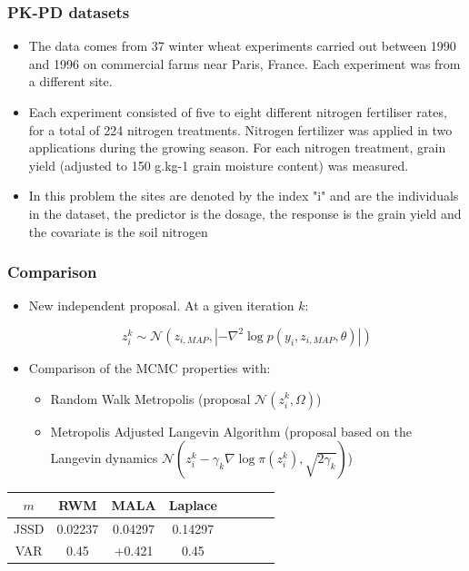 \documentclass[xcolor={dvipsnames}]{beamer}
\begin{document}
\begin{frame}
\frametitle{PK-PD datasets}

\begin{itemize}
\item The data comes from 37 winter wheat experiments carried out between 1990
and 1996 on commercial farms near Paris, France. Each experiment was from a different site.
\item Each experiment consisted of five to eight different nitrogen fertiliser rates, for a total of 224 nitrogen treatments. Nitrogen fertilizer was applied in two applications during the growing season. For each nitrogen treatment, grain yield (adjusted to 150 g.kg-1 grain moisture content) was measured.
\item In this problem the sites are denoted by the index "i" and are the individuals in the dataset, the predictor is the dosage, the response is the grain yield and the covariate is the soil nitrogen
\end{itemize}
\end{frame}

\begin{frame}
\frametitle{Comparison}

\begin{itemize}
\item New independent proposal. At a given iteration $k$:

  \begin{equation}
  z_i^k \sim \mathcal{N}(z_{i,MAP}, |-\nabla^2\log p(y_i,z_{i,MAP},\theta)|)
  \end{equation}
\item Comparison of the MCMC properties with:
\begin{itemize}
  \item Random Walk Metropolis (proposal $\mathcal{N}(z_i^k , \Omega)$)
  \item Metropolis Adjusted Langevin Algorithm (proposal based on the Langevin dynamics $\mathcal{N}(z_i^k - \gamma_k \nabla \log \pi(z_i^k), \sqrt{2\gamma_k})$)
\end{itemize}
\end{itemize}


\begin{center}
\begin{tabular}{SSSSSSSS} \toprule
    {$m$} & {RWM} & {MALA} & {Laplace} \\ \midrule
    JSSD  & 0.02237 & 0.04297 & 0.14297 \\
    VAR & 0.45   & +0.421 & 0.45  \\ \bottomrule
\end{tabular}
\end{center}

\end{frame}
\end{document}
